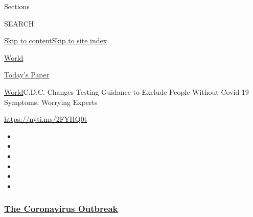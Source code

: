 Sections

SEARCH

\protect\hyperlink{site-content}{Skip to
content}\protect\hyperlink{site-index}{Skip to site index}

\href{https://www.nytimes3xbfgragh.onion/section/world}{World}

\href{https://myaccount.nytimes3xbfgragh.onion/auth/login?response_type=cookie\&client_id=vi}{}

\href{https://www.nytimes3xbfgragh.onion/section/todayspaper}{Today's
Paper}

\href{/section/world}{World}\textbar{}C.D.C. Changes Testing Guidance to
Exclude People Without Covid-19 Symptoms, Worrying Experts

\url{https://nyti.ms/2FYHQ0t}

\begin{itemize}
\item
\item
\item
\item
\item
\item
\end{itemize}

\hypertarget{the-coronavirus-outbreak}{%
\subsubsection{\texorpdfstring{\href{https://www.nytimes3xbfgragh.onion/news-event/coronavirus?name=styln-coronavirus-national\&region=TOP_BANNER\&block=storyline_menu_recirc\&action=click\&pgtype=Article\&impression_id=e1bcedc0-f4b3-11ea-8aa9-63c77993ef22\&variant=undefined}{The
Coronavirus
Outbreak}}{The Coronavirus Outbreak}}\label{the-coronavirus-outbreak}}

